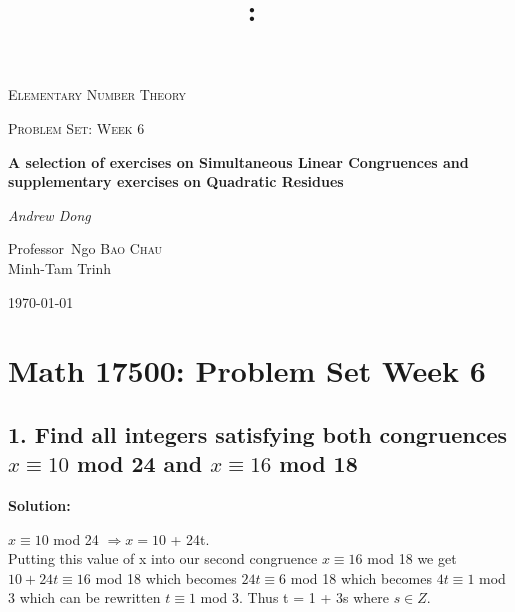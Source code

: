 \documentclass{article}
\title{\vspace{2in}\textmd{\textbf{\hmwkClass:\ \hmwkTitle}}\\\normalsize\vspace{0.1in}\vspace{0.1in}\large{\textit{\hmwkClassInstructor}}\vspace{3in}}
\date{}
\author{\textbf{\hmwkAuthorName}}
\begin{document}
\begin{spacing}{1.1}
\newpage

\begin{titlepage}
	\centering
	{\scshape\LARGE Elementary Number Theory \par}
	\vspace{1cm}
	{\scshape\Large Problem Set: Week 6\par}
	\vspace{1.5cm}
	{\huge\bfseries A selection of exercises on Simultaneous Linear Congruences and supplementary exercises on Quadratic Residues\par}
	\vspace{1cm}
	{\Large\itshape Andrew Dong\par}
	\vspace{2cm}

	\vfill


	Professor~Ngo \textsc{Bao Chau}
	\\ Minh-Tam Trinh
	\vspace{5 mm}
	\\{\large \today\par}
\end{titlepage}


\clearpage

\section{Math 17500: Problem Set Week 6}

\subsection{1.  Find all integers satisfying both congruences $x \equiv 10$ mod 24 and $x \equiv 16$ mod 18}

\textbf{Solution: }

$x \equiv 10$ mod 24 $\Rightarrow x = 10$ + 24t.  
\\ Putting this value of x into our second congruence $x \equiv 16$ mod 18 we get
\\$10 + 24t \equiv 16$ mod 18 which becomes $24t \equiv 6$ mod 18 which becomes $4t \equiv 1$ mod 3 which can be rewritten $t \equiv 1$ mod 3.  Thus t = 1 + 3s where $s \in Z$.  


\end{spacing}
\end{document}
